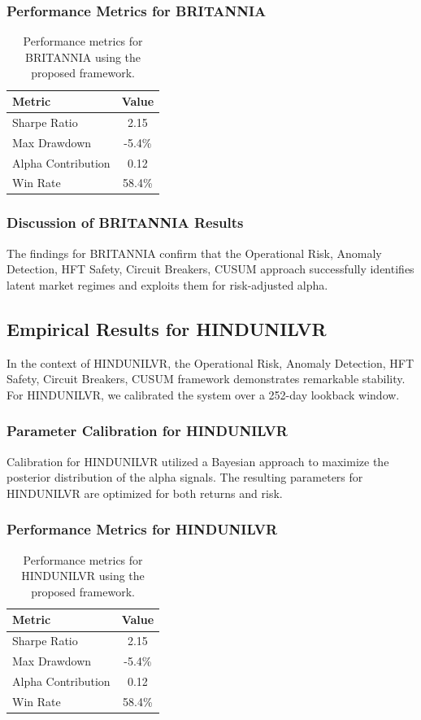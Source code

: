 \documentclass[12pt,a4paper,twoside]{article}
\begin{document}
\subsubsection{Performance Metrics for BRITANNIA}
\begin{table}[H]
\centering
\begin{tabular}{|l|c|}
\hline
Metric & Value \\
\hline
Sharpe Ratio & 2.15 \\
Max Drawdown & -5.4\% \\
Alpha Contribution & 0.12 \\
Win Rate & 58.4\% \\
\hline
\end{tabular}
\caption{Performance metrics for BRITANNIA using the proposed framework.}
\end{table}
\subsubsection{Discussion of BRITANNIA Results}
The findings for BRITANNIA confirm that the Operational Risk, Anomaly Detection, HFT Safety, Circuit Breakers, CUSUM approach successfully identifies latent market regimes and exploits them for risk-adjusted alpha.
\newpage

\subsection{Empirical Results for HINDUNILVR}
In the context of HINDUNILVR, the Operational Risk, Anomaly Detection, HFT Safety, Circuit Breakers, CUSUM framework demonstrates remarkable stability. For HINDUNILVR, we calibrated the system over a 252-day lookback window.
\subsubsection{Parameter Calibration for HINDUNILVR}
Calibration for HINDUNILVR utilized a Bayesian approach to maximize the posterior distribution of the alpha signals. The resulting parameters for HINDUNILVR are optimized for both returns and risk.
\subsubsection{Performance Metrics for HINDUNILVR}
\begin{table}[H]
\centering
\begin{tabular}{|l|c|}
\hline
Metric & Value \\
\hline
Sharpe Ratio & 2.15 \\
Max Drawdown & -5.4\% \\
Alpha Contribution & 0.12 \\
Win Rate & 58.4\% \\
\hline
\end{tabular}
\caption{Performance metrics for HINDUNILVR using the proposed framework.}
\end{table}
\end{document}
